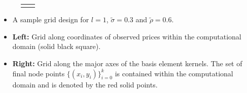 \documentclass{beamer}
\begin{document}
\begin{frame}
\begin{figure}
\begin{tabular}{cc}
\begin{minipage}{0.4\textwidth}
    \end{minipage}
  \end{tabular}
\end{figure}
\begin{itemize}
  \item A sample grid design for $l=1$, $\tilde{\sigma}=0.3$ and
    $\tilde{\rho}=0.6$.
  \item \textbf{Left:} Grid along coordinates of observed prices
    within the computational domain (solid black square).
  \item \textbf{Right:} Grid along the major axes of the basis
    element kernels. The set of final node points
    $\{ (x_i,y_i) \}_{i=0}^{k}$ is contained within the computational
    domain and is denoted by the red solid points.
\end{itemize}
\end{frame}
\end{document}
